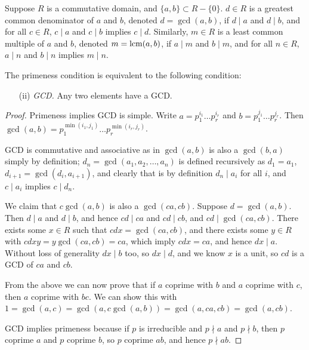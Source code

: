 \begin{definition}
    Suppose \(R\) is a commutative domain, and \(\{a,b\} \subset R - \{0\}\).
    \(d \in R\) is a greatest common denominator of \(a\) and \(b\),
    denoted \(d = \gcd(a,b)\),
    if \(d \mid a\) and \(d \mid b\),
    and for all \(c \in R\), \(c \mid a\) and \(c \mid b\) implies \(c \mid d\).
    Similarly, \(m \in R\) is a least common multiple of \(a\) and \(b\),
    denoted \(m = \operatorname{lcm}(a,b)\),
    if \(a \mid m\) and \(b \mid m\),
    and for all \(n \in R\), \(a \mid n\) and \(b \mid n\) implies \(m \mid n\).
\end{definition}
\begin{theorem}
    The primeness condition is equivalent to the following condition:
    \begin{enumerate}[itemsep=0mm]
        \item[(ii)] \textit{GCD.}
        Any two elements have a GCD.\@
    \end{enumerate}
\end{theorem}
\begin{proof}
    Primeness implies GCD is simple.
    Write \(a = p_1^{i_1} \hdots p_r^{i_r}\)
    and \(b = p_1^{j_1} \hdots p_r^{j_r}\).
    Then \(\gcd(a,b) = p_1^{\min(i_1,j_1)} \hdots p_r^{\min(i_r,j_r)}\).

    \medskip

    GCD is commutative and associative
    as in \(\gcd(a,b)\) is also a \(\gcd(b,a)\) simply by definition;
    \(d_n = \gcd(a_1,a_2,\hdots,a_n)\) is defined recursively as
    \(d_1 = a_1\), \(d_{i+1} = \gcd(d_i,a_{i+1})\),
    and clearly that is by definition \(d_n \mid a_i\) for all \(i\),
    and \(c \mid a_i\) implies \(c \mid d_n\).

    We claim that \(c\gcd(a,b)\) is also a \(\gcd(ca,cb)\).
    Suppose \(d = \gcd(a,b)\).
    Then \(d \mid a\) and \(d \mid b\),
    and hence \(cd \mid ca\) and \(cd \mid cb\),
    and \(cd \mid \gcd(ca,cb)\).
    There exists some \(x \in R\) such that \(cdx = \gcd(ca,cb)\),
    and there exists some \(y \in R\) with \(cdxy = y\gcd(ca,cb) = ca\),
    which imply \(cdx = ca\), and hence \(dx \mid a\).
    Without loss of generality \(dx \mid b\) too, so \(dx \mid d\),
    and we know \(x\) is a unit, so \(cd\) is a GCD of \(ca\) and \(cb\).

    From the above we can now prove that if \(a\) coprime with \(b\)
    and \(a\) coprime with \(c\),
    then \(a\) coprime with \(bc\).
    We can show this with \(1 = \gcd(a,c) = \gcd(a,c\gcd(a,b))
    = \gcd(a,ca,cb) = \gcd(a,cb)\).

    GCD implies primeness because if \(p\) is irreducible
    and \(p \nmid a\) and \(p \nmid b\),
    then \(p\) coprime \(a\) and \(p\) coprime \(b\),
    so \(p\) coprime \(ab\),
    and hence \(p \nmid ab\).
\end{proof}

